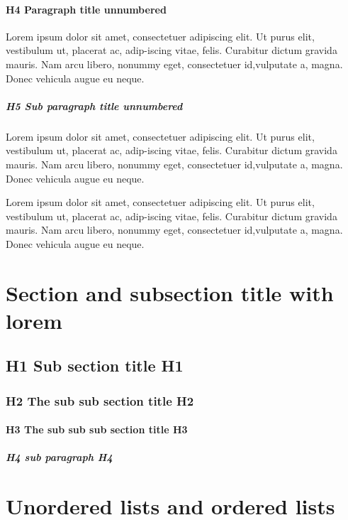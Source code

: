 \documentclass[Theme1]{{template_material/eurostat}}
\begin{document}
\paragraph*{H4 Paragraph title unnumbered}
Lorem ipsum dolor sit amet, consectetuer adipiscing elit. Ut purus elit, vestibulum ut, placerat ac, adip-iscing vitae, felis. Curabitur dictum gravida mauris. Nam arcu libero, nonummy eget, consectetuer id,vulputate a, magna. Donec vehicula augue eu neque.

\subparagraph*{H5 Sub paragraph title unnumbered}
Lorem ipsum dolor sit amet, consectetuer adipiscing elit. Ut purus elit, vestibulum ut, placerat ac, adip-iscing vitae, felis. Curabitur dictum gravida mauris. Nam arcu libero, nonummy eget, consectetuer id,vulputate a, magna. Donec vehicula augue eu neque.

Lorem ipsum dolor sit amet, consectetuer adipiscing elit. Ut purus elit, vestibulum ut, placerat ac, adip-iscing vitae, felis. Curabitur dictum gravida mauris. Nam arcu libero, nonummy eget, consectetuer id,vulputate a, magna. Donec vehicula augue eu neque.

\newpage %

\section{Section and subsection title with lorem}



\subsection{H1 Sub section title H1}
\lipsum[1-1]
\subsubsection{H2 The sub sub section title H2}
\lipsum[1-1]
\paragraph{H3 The sub sub sub section title H3}
\lipsum[1-1]
\subparagraph{H4 sub paragraph H4}
\lipsum[1-1]

\newpage %
\section{Unordered lists and ordered lists}
\end{document}
